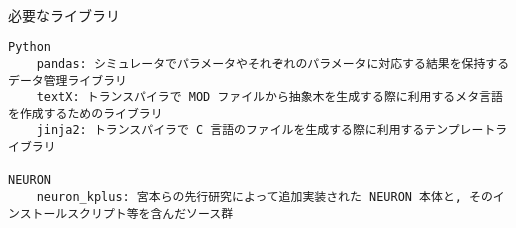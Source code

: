 \\
\begin{table}[htb]
  \caption {必要なライブラリ}
{\footnotesize
\begin{framed}
\begin{verbatim}
Python
    pandas: シミュレータでパラメータやそれぞれのパラメータに対応する結果を保持するデータ管理ライブラリ
    textX: トランスパイラで MOD ファイルから抽象木を生成する際に利用するメタ言語を作成するためのライブラリ
    jinja2: トランスパイラで C 言語のファイルを生成する際に利用するテンプレートライブラリ

NEURON
    neuron_kplus: 宮本らの先行研究によって追加実装された NEURON 本体と, そのインストールスクリプト等を含んだソース群
\end{verbatim}
\end{framed}
}
\end{table}
\\

{\footnotesize

}

{\footnotesize

}

